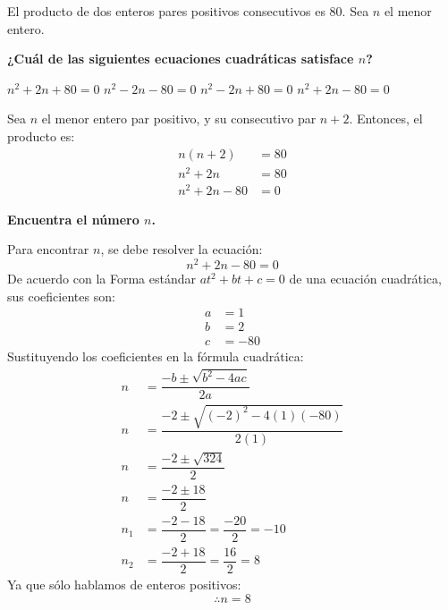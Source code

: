 El producto de dos enteros pares positivos consecutivos es 80. Sea $n$ el menor entero.

\begin{subparts}
    \subpart  \textbf{¿Cuál de las siguientes ecuaciones cuadráticas satisface $n$?}

    \begin{oneparchoices}
        \choice $n^2+2n+80=0$
        \choice $n^2-2n-80=0$
        \choice $n^2-2n+80=0$
        \CorrectChoice $n^2+2n-80=0$
    \end{oneparchoices}

    \vspace{0.5cm}
    \begin{solutionbox}{3.5cm}
        Sea $n$ el menor entero par positivo, y su consecutivo par $n+2$. Entonces, el producto es:
        \begin{align*}
            n(n+2)     & =80 \\
            n^2+2n     & =80 \\
            n^2+2n -80 & =0
        \end{align*}
    \end{solutionbox}

    \subpart \textbf{Encuentra el número $n$.}

    \begin{solutionbox}{15cm}
        Para encontrar $n$, se debe resolver la ecuación:
        \[
            n^2+2n -80 =0
        \]
        De acuerdo con la Forma estándar $at^2 + bt + c = 0$ de una ecuación cuadrática, sus coeficientes son:
        \begin{align*}
            a & =1   \\
            b & =2   \\
            c & =-80
        \end{align*}
        Sustituyendo los coeficientes en la fórmula cuadrática:
        \begin{align*}
            n   & = \dfrac{-b\pm\sqrt{b^2-4ac}}{2a}            \\[1.5em]
            n   & = \dfrac{-2\pm\sqrt{(-2)^2-4(1)(-80)}}{2(1)} \\[1.5em]
            n   & = \dfrac{-2\pm\sqrt{324}}{2}                 \\[1.5em]
            n   & = \dfrac{-2\pm 18}{2}                        \\[1.5em]
            n_1 & = \dfrac{-2-18}{2}=\dfrac{-20}{2}=-10        \\[1.5em]
            n_2 & = \dfrac{-2+18}{2}=\dfrac{16}{2}=8
        \end{align*}
        Ya que sólo hablamos de enteros positivos:
        \[\therefore n=8\]
    \end{solutionbox}
\end{subparts}